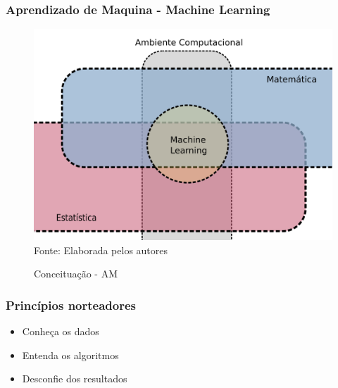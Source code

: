 \documentclass[11pt, aspectratio=169]{beamer}
\begin{document}
\begin{frame}
  \frametitle{Aprendizado de Maquina - Machine Learning}


  \begin{figure}[!htb]
    \centering
    \caption{Conceituação - AM}
    \includegraphics[height=.6\paperheight]{../Figures/ML/mat_est_ML.png}
    \\{\footnotesize Fonte: Elaborada pelos autores}
    \label{fig:diag_ml_01}
  \end{figure}

\end{frame}



\begin{frame}
  \frametitle{Princípios norteadores}

  \begin{large}
    \begin{center}
      \begin{itemize}
        \item Conheça os dados
        \item Entenda os algoritmos
        \item Desconfie dos resultados
      \end{itemize}
    \end{center}
  \end{large}

\end{frame}
\end{document}

